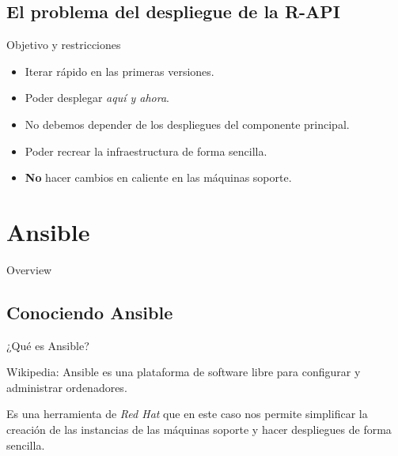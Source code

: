 \documentclass[12pt, aspectratio=169]{beamer} %
\begin{document}
\subsection{El problema del despliegue de la R-API}

\begin{frame}{Objetivo y restricciones}
  \begin{itemize}
  \item Iterar rápido en las primeras versiones.
  \item Poder desplegar \textit{aquí y ahora}.
  \item No debemos depender de los despliegues del componente principal.
  \item Poder recrear la infraestructura de forma sencilla.
  \item \textbf{No} hacer cambios en caliente en las máquinas soporte.
  \end{itemize}
  
\end{frame}

\section{Ansible}

\begin{frame}{Overview}
\tableofcontents
\end{frame}


\subsection{Conociendo Ansible}

\begin{frame}{¿Qué es Ansible?}
  \begin{block}{Wikipedia:}
    Ansible es una plataforma de software libre para configurar y administrar ordenadores.
  \end{block}

  Es una herramienta de \textit{Red Hat} que en este caso nos permite simplificar la creación de las instancias de las máquinas soporte y hacer despliegues de forma sencilla.
\end{frame}
\end{document}
